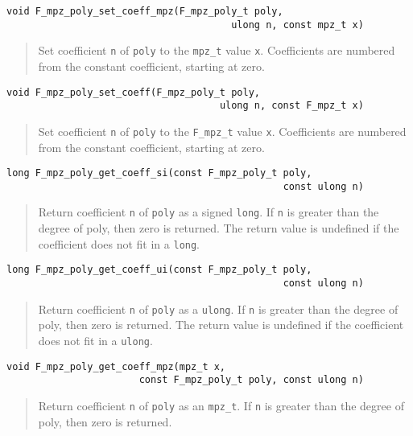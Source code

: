 \documentclass[a4paper,10pt]{article}
\newcommand{\code}{\lstinline}
\begin{document}
\begin{lstlisting}
void F_mpz_poly_set_coeff_mpz(F_mpz_poly_t poly, 
                                       ulong n, const mpz_t x)
\end{lstlisting}
\begin{quote}
Set coefficient \code{n} of \code{poly} to the \code{mpz_t} value \code{x}. Coefficients are 
numbered from the constant coefficient, starting at zero.
\end{quote}

\begin{lstlisting}
void F_mpz_poly_set_coeff(F_mpz_poly_t poly, 
                                     ulong n, const F_mpz_t x)
\end{lstlisting}
\begin{quote}
Set coefficient \code{n} of \code{poly} to the \code{F_mpz_t} value \code{x}. Coefficients are 
numbered from the constant coefficient, starting at zero.
\end{quote}

\begin{lstlisting}
long F_mpz_poly_get_coeff_si(const F_mpz_poly_t poly, 
                                                const ulong n)
\end{lstlisting}
\begin{quote}
Return coefficient \code{n} of \code{poly} as a signed \code{long}. If \code{n} is greater than 
the degree of poly, then zero is returned. The return value is undefined if the coefficient does
not fit in a \code{long}.
\end{quote}

\begin{lstlisting}
long F_mpz_poly_get_coeff_ui(const F_mpz_poly_t poly, 
                                                const ulong n)
\end{lstlisting}
\begin{quote}
Return coefficient \code{n} of \code{poly} as a \code{ulong}. If \code{n} is greater than 
the degree of poly, then zero is returned. The return value is undefined if the coefficient does
not fit in a \code{ulong}.
\end{quote}

\begin{lstlisting}
void F_mpz_poly_get_coeff_mpz(mpz_t x, 
                       const F_mpz_poly_t poly, const ulong n)
\end{lstlisting}
\begin{quote}
Return coefficient \code{n} of \code{poly} as an \code{mpz_t}. If \code{n} is greater than 
the degree of poly, then zero is returned. 
\end{quote}
\end{document}
